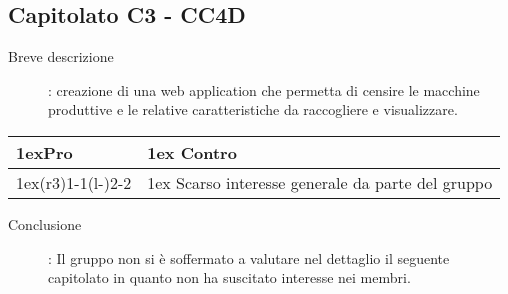 \subsection{Capitolato C3 - CC4D}
\begin{description}
\item [Breve descrizione]: creazione di una web application che permetta di censire le macchine produttive e le relative caratteristiche da raccogliere e visualizzare.
\end{description}
\begin{table}[h]
\begin{tabularx}{\linewidth}{>{\parskip1ex}X@{\kern4\tabcolsep}>{\parskip1ex}X}
\hfil\bfseries Pro
&
\hfil\bfseries Contro
\\\cmidrule(r{3\tabcolsep}){1-1}\cmidrule(l{-\tabcolsep}){2-2}
 
&
Scarso interesse generale da parte del gruppo \\
\end{tabularx}
\end{table}
\begin{description}
	\item [Conclusione]: Il gruppo non si è soffermato a valutare nel dettaglio il seguente capitolato in quanto non ha suscitato interesse nei membri.
\end{description}

\vspace{1cm}

